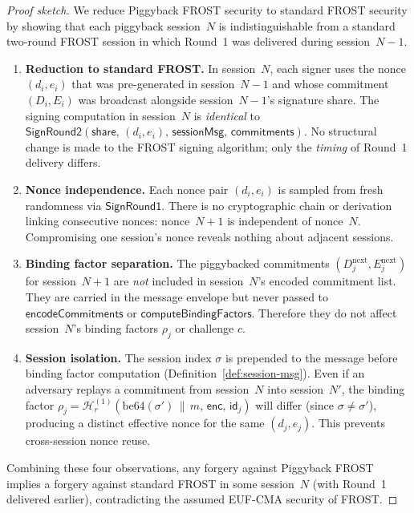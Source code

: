 \documentclass[11pt,a4paper]{article}
\newcommand{\id}{\mathsf{id}}
\newcommand{\hash}{\mathcal{H}}
\begin{document}
\begin{proof}[Proof sketch]
  We reduce Piggyback FROST security to standard FROST security by showing
  that each piggyback session~$N$ is indistinguishable from a standard
  two-round FROST session in which Round~1 was delivered during session~$N{-}1$.

  \begin{enumerate}
    \item \textbf{Reduction to standard FROST.}
      In session~$N$, each signer uses the nonce $(d_i, e_i)$ that was
      pre-generated in session~$N{-}1$ and whose commitment $(D_i, E_i)$ was
      broadcast alongside session~$N{-}1$'s signature share.  The signing
      computation in session~$N$ is \emph{identical} to
      $\mathsf{SignRound2}(\mathsf{share},\, (d_i, e_i),\,
      \mathsf{sessionMsg},\, \mathsf{commitments})$.  No structural change is
      made to the FROST signing algorithm; only the \emph{timing} of Round~1
      delivery differs.

    \item \textbf{Nonce independence.}
      Each nonce pair $(d_i, e_i)$ is sampled from fresh randomness via
      $\mathsf{SignRound1}$.  There is no cryptographic chain or derivation
      linking consecutive nonces: nonce~$N{+}1$ is independent of nonce~$N$.
      Compromising one session's nonce reveals nothing about adjacent sessions.

    \item \textbf{Binding factor separation.}
      The piggybacked commitments $(D_j^{\mathrm{next}}, E_j^{\mathrm{next}})$
      for session~$N{+}1$ are \emph{not} included in session~$N$'s encoded
      commitment list.  They are carried in the message envelope but never
      passed to $\mathsf{encodeCommitments}$ or
      $\mathsf{computeBindingFactors}$.  Therefore they do not affect
      session~$N$'s binding factors $\rho_j$ or challenge $c$.

    \item \textbf{Session isolation.}
      The session index $\sigma$ is prepended to the message before binding
      factor computation (Definition~\ref{def:session-msg}).  Even if an
      adversary replays a commitment from session~$N$ into session~$N'$, the
      binding factor $\rho_j = \hash_r^{(1)}(\mathrm{be64}(\sigma') \,\|\, m,\,
      \mathsf{enc},\, \id_j)$ will differ (since $\sigma \ne \sigma'$),
      producing a distinct effective nonce for the same $(d_j, e_j)$.  This
      prevents cross-session nonce reuse.
  \end{enumerate}

  Combining these four observations, any forgery against Piggyback FROST
  implies a forgery against standard FROST in some session~$N$ (with Round~1
  delivered earlier), contradicting the assumed EUF-CMA security of FROST.
\end{proof}
\end{document}
